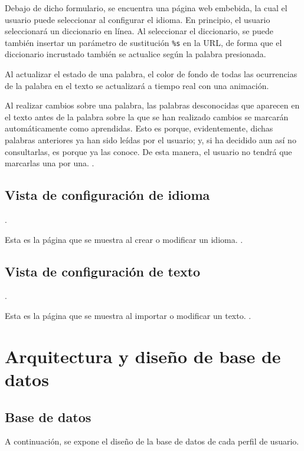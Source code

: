 Debajo de dicho formulario, se encuentra una página web embebida, la cual el usuario puede seleccionar al configurar el idioma. En principio, el usuario seleccionará un diccionario en línea. Al seleccionar el diccionario, se puede también insertar un parámetro de sustitución \texttt{\%s} en la URL, de forma que el diccionario incrustado también se actualice según la palabra presionada.

Al actualizar el estado de una palabra, el color de fondo de todas las ocurrencias de la palabra en el texto se actualizará a tiempo real con una animación.

Al realizar cambios sobre una palabra, las palabras desconocidas que aparecen en el texto antes de la palabra sobre la que se han realizado cambios se marcarán automáticamente como aprendidas. Esto es porque, evidentemente, dichas palabras anteriores ya han sido leídas por el usuario; y, si ha decidido aun así no consultarlas, es porque ya las conoce. De esta manera, el usuario no tendrá que marcarlas una por una. .

\subsection{Vista de configuración de idioma}

.

Esta es la página que se muestra al crear o modificar un idioma. .

\subsection{Vista de configuración de texto}

.

Esta es la página que se muestra al importar o modificar un texto. .

\section{Arquitectura y diseño de base de datos}

\subsection{Base de datos}

A continuación, se expone el diseño de la base de datos de cada perfil de usuario.

